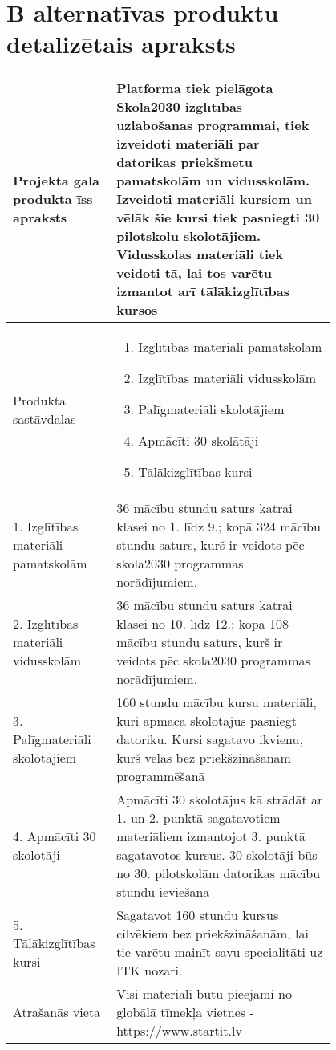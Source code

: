\section{B alternatīvas produktu detalizētais apraksts}
    \label{app:B_detalizetais_aprkasts}
    \begin{table}[!ht]
        \centering
        \begin{tabular}{|p{0.2\linewidth}|p{0.6\linewidth}|}
            \hline
            Projekta gala produkta īss apraksts & 
            Platforma tiek pielāgota Skola2030 izglītības uzlabošanas programmai,
            tiek izveidoti materiāli par datorikas priekšmetu pamatskolām un vidusskolām.
            Izveidoti materiāli kursiem un vēlāk šie kursi tiek pasniegti 30 pilotskolu
            skolotājiem. Vidusskolas materiāli tiek veidoti tā, lai tos varētu izmantot arī
            tālākizglītības kursos
            \\
            \hline
            Produkta sastāvdaļas &
            \begin{enumerate}
                \item Izglītības materiāli pamatskolām
                \item Izglītības materiāli vidusskolām
                \item Palīgmateriāli skolotājiem
                \item Apmācīti 30 skolātāji
                \item Tālākizglītības kursi
            \end{enumerate} \\
            \hline
            1. Izglītības materiāli pamatskolām & 
            36 mācību stundu saturs katrai klasei no 1. līdz 9.; kopā 324 mācību
            stundu saturs, kurš ir veidots pēc skola2030 programmas norādījumiem.
            \\
            \hline
            2. Izglītības materiāli vidusskolām & 
            36 mācību stundu saturs katrai klasei no 10. līdz 12.; kopā 108 mācību
            stundu saturs, kurš ir veidots pēc skola2030 programmas norādījumiem.
            \\
            \hline
            3. Palīgmateriāli skolotājiem & 
            160 stundu mācību kursu materiāli, kuri apmāca skolotājus pasniegt
            datoriku. Kursi sagatavo ikvienu, kurš vēlas bez priekšzināšanām
            programmēšanā
            \\
            \hline
            4. Apmācīti 30 skolotāji &
             Apmācīti 30 skolotājus kā strādāt ar 1. un 2. punktā sagatavotiem
             materiāliem izmantojot 3. punktā sagatavotos kursus. 30 skolotāji
             būs no 30. pilotskolām datorikas mācību stundu ieviešanā \\
            \hline
            5. Tālākizglītības kursi & 
            Sagatavot 160 stundu kursus cilvēkiem bez priekšzināšanām, lai tie varētu
            mainīt savu specialitāti uz ITK nozari. \\
            \hline
            Atrašanās vieta & Visi materiāli būtu pieejami no globālā tīmekļa vietnes - https://www.startit.lv \\
            \hline
        \end{tabular}
    \end{table}
    \clearpage

